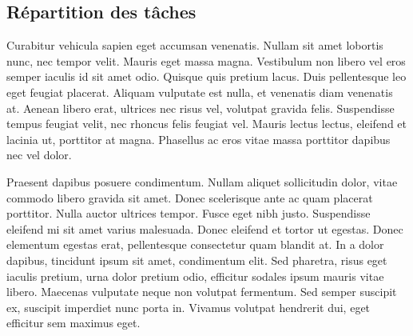 	\subsection{Répartition des tâches}
		Curabitur vehicula sapien eget accumsan venenatis. Nullam sit amet lobortis nunc, nec tempor velit. Mauris eget massa magna. Vestibulum non libero vel eros semper iaculis id sit amet odio. Quisque quis pretium lacus. Duis pellentesque leo eget feugiat placerat. Aliquam vulputate est nulla, et venenatis diam venenatis at. Aenean libero erat, ultrices nec risus vel, volutpat gravida felis. Suspendisse tempus feugiat velit, nec rhoncus felis feugiat vel. Mauris lectus lectus, eleifend et lacinia ut, porttitor at magna. Phasellus ac eros vitae massa porttitor dapibus nec vel dolor.

		Praesent dapibus posuere condimentum. Nullam aliquet sollicitudin dolor, vitae commodo libero gravida sit amet. Donec scelerisque ante ac quam placerat porttitor. Nulla auctor ultrices tempor. Fusce eget nibh justo. Suspendisse eleifend mi sit amet varius malesuada. Donec eleifend et tortor ut egestas. Donec elementum egestas erat, pellentesque consectetur quam blandit at. In a dolor dapibus, tincidunt ipsum sit amet, condimentum elit. Sed pharetra, risus eget iaculis pretium, urna dolor pretium odio, efficitur sodales ipsum mauris vitae libero. Maecenas vulputate neque non volutpat fermentum. Sed semper suscipit ex, suscipit imperdiet nunc porta in. Vivamus volutpat hendrerit dui, eget efficitur sem maximus eget. 